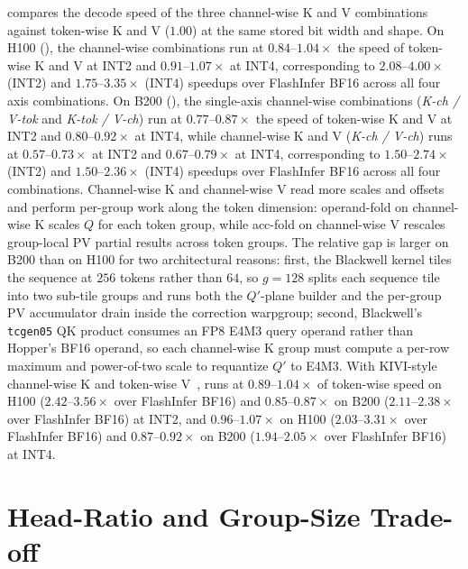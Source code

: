 compares the decode speed of the three channel-wise K and V combinations against token-wise K and V ($1.00$) at the same stored bit width and shape.
On H100 (), the channel-wise combinations run at $0.84$--$1.04\times$ the speed of token-wise K and V at INT2 and $0.91$--$1.07\times$ at INT4, corresponding to $2.08$--$4.00\times$ (INT2) and $1.75$--$3.35\times$ (INT4) speedups over FlashInfer BF16 across all four axis combinations.
On B200 (), the single-axis channel-wise combinations (\emph{K-ch / V-tok} and \emph{K-tok / V-ch}) run at $0.77$--$0.87\times$ the speed of token-wise K and V at INT2 and $0.80$--$0.92\times$ at INT4, while channel-wise K and V (\emph{K-ch / V-ch}) runs at $0.57$--$0.73\times$ at INT2 and $0.67$--$0.79\times$ at INT4, corresponding to $1.50$--$2.74\times$ (INT2) and $1.50$--$2.36\times$ (INT4) speedups over FlashInfer BF16 across all four combinations.
Channel-wise K and channel-wise V read more scales and offsets and perform per-group work along the token dimension: operand-fold on channel-wise K scales $Q$ for each token group, while acc-fold on channel-wise V rescales group-local PV partial results across token groups.
The relative gap is larger on B200 than on H100 for two architectural reasons: first, the Blackwell kernel tiles the sequence at $256$ tokens rather than $64$, so $g=128$ splits each sequence tile into two sub-tile groups and runs both the $Q'$-plane builder and the per-group PV accumulator drain inside the correction warpgroup; second, Blackwell's \texttt{tcgen05} QK product consumes an FP8 E4M3 query operand rather than Hopper's BF16 operand, so each channel-wise K group must compute a per-row maximum and power-of-two scale to requantize $Q'$ to E4M3.
With KIVI-style channel-wise K and token-wise V~\cite{liu2024kivi,hooper2024kvquant}, \sys{} runs at $0.89$--$1.04\times$ of token-wise speed on H100 ($2.42$--$3.56\times$ over FlashInfer BF16) and $0.85$--$0.87\times$ on B200 ($2.11$--$2.38\times$ over FlashInfer BF16) at INT2, and $0.96$--$1.07\times$ on H100 ($2.03$--$3.31\times$ over FlashInfer BF16) and $0.87$--$0.92\times$ on B200 ($1.94$--$2.05\times$ over FlashInfer BF16) at INT4.

\section{Head-Ratio and Group-Size Trade-off}
\label{sec:appendix-head-scaling}




